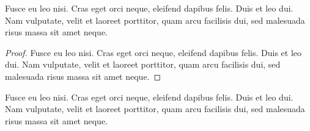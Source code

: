 \documentclass[a4paper,UKenglish,cleveref, autoref]{lipics-v2019}
\begin{document}
\begin{claim*}\label{testenv-claim2}
Fusce eu leo nisi. Cras eget orci neque, eleifend dapibus felis. Duis et leo dui. Nam vulputate, velit et laoreet porttitor, quam arcu facilisis dui, sed malesuada risus massa sit amet neque.
\end{claim*}

\begin{proof}
Fusce eu leo nisi. Cras eget orci neque, eleifend dapibus felis. Duis et leo dui. Nam vulputate, velit et laoreet porttitor, quam arcu facilisis dui, sed malesuada risus massa sit amet neque.
\end{proof}

\begin{claimproof}
Fusce eu leo nisi. Cras eget orci neque, eleifend dapibus felis. Duis et leo dui. Nam vulputate, velit et laoreet porttitor, quam arcu facilisis dui, sed malesuada risus massa sit amet neque.
\end{claimproof}
\end{document}
